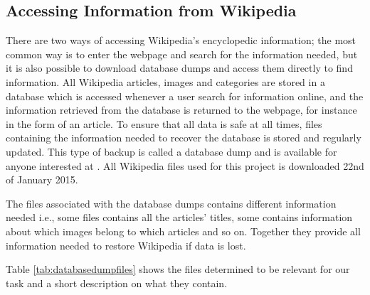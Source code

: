
\subsection{Accessing Information from Wikipedia}
There are two ways of accessing Wikipedia’s encyclopedic information; the most common way is to enter the webpage and search for the information needed, but it is also possible to download database dumps and access them directly to find information. All Wikipedia articles, images and categories are stored in a database which is accessed whenever a user search for information online, and the information retrieved from the database is returned to the webpage, for instance in the form of an article. To ensure that all data is safe at all times, files containing the information needed to recover the database is stored and regularly updated\cite{wiki:databasedownload}. This type of backup is called a database dump and is available for anyone interested at \cite{databasedownload}. All Wikipedia files used for this project is downloaded 22nd of January 2015. 

The files associated with the database dumps contains different information needed i.e., some files contains all the articles' titles, some contains information about which images belong to which articles and so on. Together they provide all information needed to restore Wikipedia if data is lost. 


Table \ref{tab:databasedumpfiles} shows the files determined to be relevant for our task and a short description on what they contain. 




